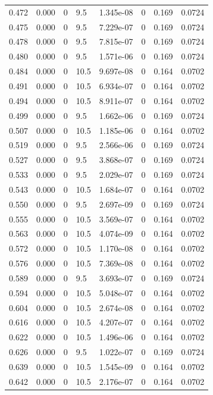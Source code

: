 \documentclass[preview]{standalone}
\begin{document}
{{{\begin{tabular}{L{1.2cm}C{1.2cm} C{0.3cm}C{0.5cm} C{1.4cm}C{1.4cm} C{1.4cm}C{1.4cm}}
  0.472  &  0.000  & 0     & 9.5 &  1.345e-08  & 0  & 0.169 &  0.0724   \\ 
  0.475  &  0.000  & 0     & 9.5 &  7.229e-07  & 0  & 0.169 &  0.0724   \\ 
  0.478  &  0.000  & 0     & 9.5 &  7.815e-07  & 0  & 0.169 &  0.0724   \\ 
  0.480  &  0.000  & 0     & 9.5 &  1.571e-06  & 0  & 0.169 &  0.0724   \\ 
  0.484  &  0.000  & 0     & 10.5 &  9.697e-08  & 0  & 0.164 &  0.0702   \\ 
  0.491  &  0.000  & 0     & 10.5 &  6.934e-07  & 0  & 0.164 &  0.0702   \\ 
  0.494  &  0.000  & 0     & 10.5 &  8.911e-07  & 0  & 0.164 &  0.0702   \\ 
  0.499  &  0.000  & 0     & 9.5 &  1.662e-06  & 0  & 0.169 &  0.0724   \\ 
  0.507  &  0.000  & 0     & 10.5 &  1.185e-06  & 0  & 0.164 &  0.0702   \\ 
  0.519  &  0.000  & 0     & 9.5 &  2.566e-06  & 0  & 0.169 &  0.0724   \\ 
  0.527  &  0.000  & 0     & 9.5 &  3.868e-07  & 0  & 0.169 &  0.0724   \\ 
  0.533  &  0.000  & 0     & 9.5 &  2.029e-07  & 0  & 0.169 &  0.0724   \\ 
  0.543  &  0.000  & 0     & 10.5 &  1.684e-07  & 0  & 0.164 &  0.0702   \\ 
  0.550  &  0.000  & 0     & 9.5 &  2.697e-09  & 0  & 0.169 &  0.0724   \\ 
  0.555  &  0.000  & 0     & 10.5 &  3.569e-07  & 0  & 0.164 &  0.0702   \\ 
  0.563  &  0.000  & 0     & 10.5 &  4.074e-09  & 0  & 0.164 &  0.0702   \\ 
  0.572  &  0.000  & 0     & 10.5 &  1.170e-08  & 0  & 0.164 &  0.0702   \\ 
  0.576  &  0.000  & 0     & 10.5 &  7.369e-08  & 0  & 0.164 &  0.0702   \\ 
  0.589  &  0.000  & 0     & 9.5 &  3.693e-07  & 0  & 0.169 &  0.0724   \\ 
  0.594  &  0.000  & 0     & 10.5 &  5.048e-07  & 0  & 0.164 &  0.0702   \\ 
  0.604  &  0.000  & 0     & 10.5 &  2.674e-08  & 0  & 0.164 &  0.0702   \\ 
  0.616  &  0.000  & 0     & 10.5 &  4.207e-07  & 0  & 0.164 &  0.0702   \\ 
  0.622  &  0.000  & 0     & 10.5 &  1.496e-06  & 0  & 0.164 &  0.0702   \\ 
  0.626  &  0.000  & 0     & 9.5 &  1.022e-07  & 0  & 0.169 &  0.0724   \\ 
  0.639  &  0.000  & 0     & 10.5 &  1.545e-09  & 0  & 0.164 &  0.0702   \\ 
  0.642  &  0.000  & 0     & 10.5 &  2.176e-07  & 0  & 0.164 &  0.0702   \\ 
\hline 
\end{tabular} 

}}}
\end{document}
